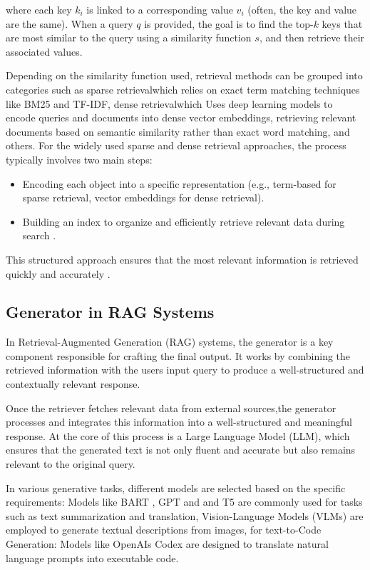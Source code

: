 \documentclass[Afour,sageh,times]{sagej}
\begin{document}
where each key \( k_i \) is linked to a corresponding value \( v_i \) (often, the key and value are the same). When a query \( q \) is provided, the goal is to find the top-\( k \) keys that are most similar to the query using a similarity function \( s \), and then retrieve their associated values\cite{gupta20241}.

Depending on the similarity function used, retrieval methods can be grouped into categories such as sparse retrieval\cite{bai2020spartermlearningtermbasedsparse}which relies on exact term matching techniques like BM25 and TF-IDF, dense retrieval\cite{karpukhin2020dpr}which Uses deep learning models to encode queries and documents into dense vector embeddings, retrieving relevant documents based on semantic similarity rather than exact word matching, and others. For the widely used sparse and dense retrieval approaches, the process typically involves two main steps:
\begin{itemize}
\item Encoding each object into a specific representation (e.g., term-based for sparse retrieval, vector embeddings for dense retrieval).
\item Building an index to organize and efficiently retrieve relevant data during search .
\end{itemize}
This structured approach ensures that the most relevant information is retrieved quickly and accurately \cite{zhao2024retrievalaugmentedgenerationaigeneratedcontent}.

\subsection{Generator  in RAG Systems}\label{subsec2}
In Retrieval-Augmented Generation (RAG) systems, the generator  \cite{huang2024surveyretrievalaugmentedtextgeneration} is a key component responsible for crafting the final output. It works by combining the retrieved information with the users input query to produce a well-structured and contextually relevant response.

Once the retriever fetches relevant data from external sources,the generator processes and integrates this information into a well-structured and meaningful  response. At the core of this process is a Large Language Model (LLM), which ensures that the generated text is not only fluent and accurate but also remains relevant to the original query.

In various generative tasks, different models are selected based on the specific requirements: Models like BART \cite{lewis2019bart}, GPT \cite{brown2020language}and and T5 \cite{raffel2020exploring} are commonly used for tasks such as text summarization and translation, Vision-Language Models (VLMs) \cite{radford2021learningtransferablevisualmodels} are employed to generate textual descriptions from images, for text-to-Code Generation: Models like OpenAIs Codex \cite{chen2021evaluatinglargelanguagemodels} are designed to translate natural language prompts into executable code.
\end{document}
